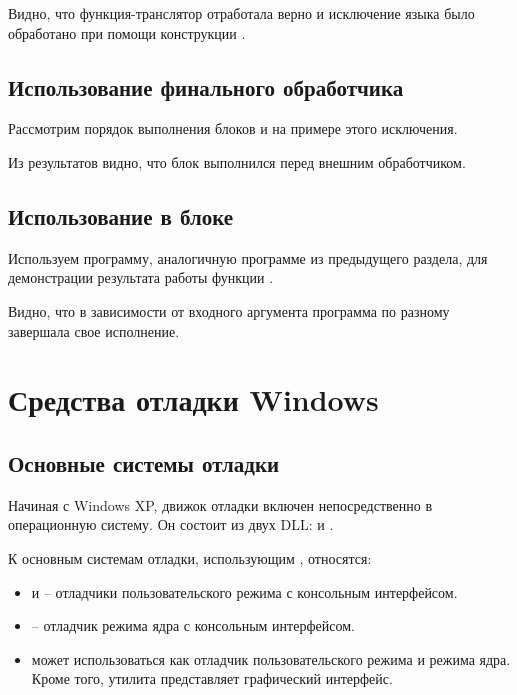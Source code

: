 Видно, что функция-транслятор отработала верно и исключение языка  было обработано при помощи конструкции .

\subsection{Использование финального обработчика }

Рассмотрим порядок выполнения блоков  и  на примере этого исключения.


Из результатов видно, что блок  выполнился перед внешним обработчиком.

\subsection{Использование  в блоке }

Используем программу, аналогичную программе из предыдущего раздела, для демонстрации результата работы функции .


Видно, что в зависимости от входного аргумента программа по разному завершала свое исполнение.

\newpage

\section{Средства отладки Windows}

\subsection{Основные системы отладки}

Начиная с Windows XP, движок отладки включен непосредственно в операционную систему. Он состоит из двух DLL:  и .

К основным системам отладки, использующим , относятся:
\begin{itemize}
	\item {} и  -- отладчики пользовательского режима с консольным интерфейсом.
	\item {} -- отладчик режима ядра с консольным интерфейсом.
	\item {} может использоваться как отладчик пользовательского режима и режима ядра. Кроме того, утилита представляет графический интерфейс.
\end{itemize}

